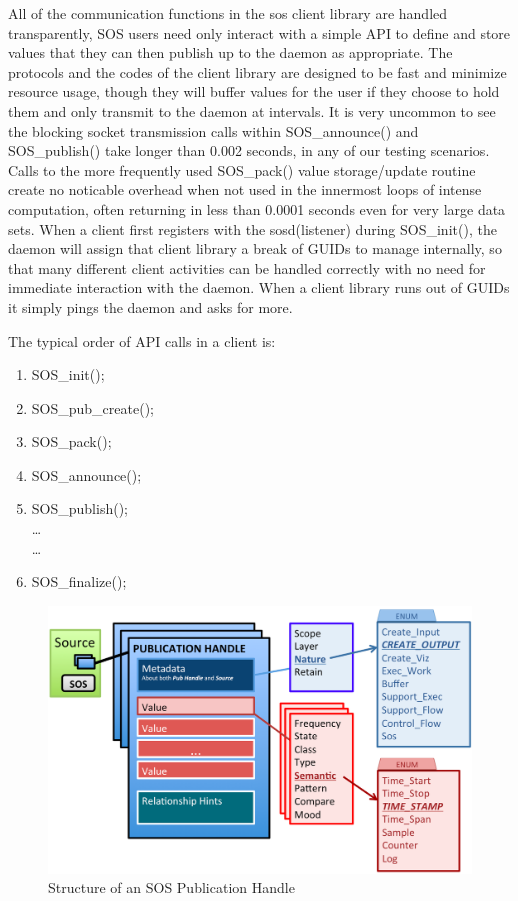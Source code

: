 All of the communication functions in the sos client library are
handled transparently, SOS users need only interact with a simple API
to define and store values that they can then publish up to the daemon
as appropriate.
%
The protocols and the codes of the client library are designed to be
fast and minimize resource usage, though they will buffer values for
the user if they choose to hold them and only transmit to the daemon
at intervals.
%
It is very uncommon to see the blocking socket transmission calls
within SOS\_announce() and SOS\_publish() take longer than 0.002
seconds, in any of our testing scenarios. Calls to the more frequently
used SOS\_pack() value storage/update routine create no noticable
overhead when not used in the innermost loops of intense computation,
often returning in less than 0.0001 seconds even for very large data
sets.
%
When a client first registers with the sosd(listener) during
SOS\_init(), the daemon will assign that client library a break of
GUIDs to manage internally, so that many different client activities
can be handled correctly with no need for immediate interaction with
the daemon.
%
When a client library runs out of GUIDs it simply pings the daemon and
asks for more.

The typical order of API calls in a client is:
%
\begin{enumerate}
    \item SOS\_init();
    \item SOS\_pub\_create();
    \item SOS\_pack();
    \item SOS\_announce();
    \item SOS\_publish();\\
    \dots\\
    \dots\\
    \item SOS\_finalize();
\end{enumerate}

\begin{figure}[!t]
\centering
\includegraphics[width=5in]{images/pub_handle.png}
\caption{Structure of an SOS Publication Handle}
\label{fig_sim}
\end{figure}

